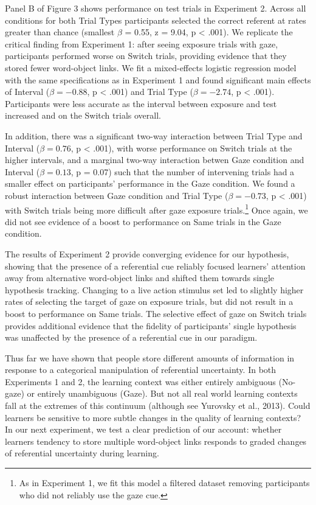 \documentclass[authoryear, review]{elsarticle}
\begin{document}
Panel B of Figure 3 shows performance on test trials in Experiment 2.
Across all conditions for both Trial Types participants selected the
correct referent at rates greater than chance (smallest \(\beta\) =
0.55, z = 9.04, p \textless{} .001). We replicate the critical finding
from Experiment 1: after seeing exposure trials with gaze, participants
performed worse on Switch trials, providing evidence that they stored
fewer word-object links. We fit a mixed-effects logistic regression
model with the same specifications as in Experiment 1 and found
significant main effects of Interval (\(\beta = -0.88\), p \textless{}
.001) and Trial Type (\(\beta = -2.74\), p \textless{} .001).
Participants were less accurate as the interval between exposure and
test increased and on the Switch trials overall.

In addition, there was a significant two-way interaction between Trial
Type and Interval (\(\beta = 0.76\), p \textless{} .001), with worse
performance on Switch trials at the higher intervals, and a marginal
two-way interaction betwen Gaze condition and Interval
(\(\beta = 0.13\), p = 0.07) such that the number of intervening trials
had a smaller effect on participants' performance in the Gaze condition.
We found a robust interaction between Gaze condition and Trial Type
(\(\beta = -0.73\), p \textless{} .001) with Switch trials being more
difficult after gaze exposure
trials.\footnote{As in Experiment 1, we fit this model a filtered dataset removing participants who did not reliably use the gaze cue.}
Once again, we did not see evidence of a boost to performance on Same
trials in the Gaze condition.

The results of Experiment 2 provide converging evidence for our
hypothesis, showing that the presence of a referential cue reliably
focused learners' attention away from alternative word-object links and
shifted them towards single hypothesis tracking. Changing to a live
action stimulus set led to slightly higher rates of selecting the target
of gaze on exposure trials, but did not result in a boost to performance
on Same trials. The selective effect of gaze on Switch trials provides
additional evidence that the fidelity of participants' single hypothesis
was unaffected by the presence of a referential cue in our paradigm.

Thus far we have shown that people store different amounts of
information in response to a categorical manipulation of referential
uncertainty. In both Experiments 1 and 2, the learning context was
either entirely ambiguous (No-gaze) or entirely unambiguous (Gaze). But
not all real world learning contexts fall at the extremes of this
continuum (although see Yurovsky et al., 2013). Could learners be
sensitive to more subtle changes in the quality of learning contexts? In
our next experiment, we test a clear prediction of our account: whether
learners tendency to store multiple word-object links responds to graded
changes of referential uncertainty during learning.
\end{document}
